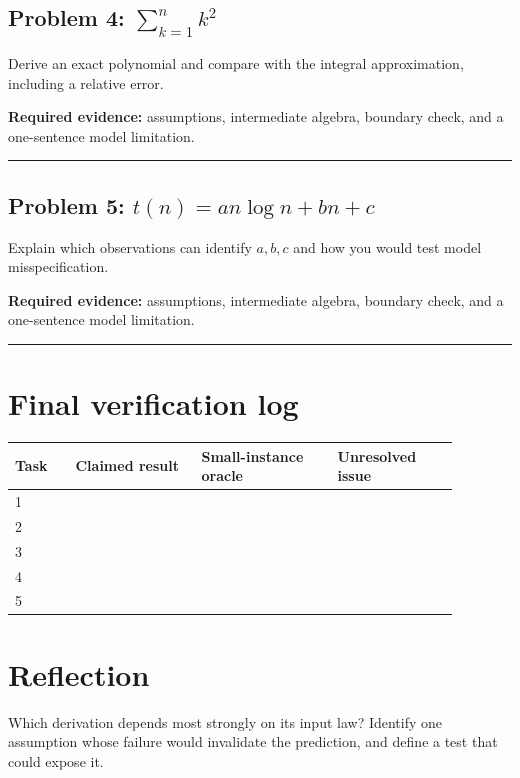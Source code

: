 \documentclass[11pt]{article}
\begin{document}
\subsection{\texorpdfstring{Problem 4: $\sum_{k=1}^{n}k^2$}{Problem 4: Sum of squares from 1 to n}}
Derive an exact polynomial and compare with the integral approximation, including a relative error.\par
\textbf{Required evidence:} assumptions, intermediate algebra, boundary check, and a one-sentence model limitation.\par
\vspace{1.2cm}\hrule\vspace{0.4cm}
\subsection{\texorpdfstring{Problem 5: $t(n)=an\log n+bn+c$}{Problem 5: Leading terms of an n-log-n function}}
Explain which observations can identify $a,b,c$ and how you would test model misspecification.\par
\textbf{Required evidence:} assumptions, intermediate algebra, boundary check, and a one-sentence model limitation.\par
\vspace{1.2cm}\hrule\vspace{0.4cm}
\section{Final verification log}
\begin{longtable}{p{0.12\linewidth}p{0.25\linewidth}p{0.27\linewidth}p{0.24\linewidth}}\toprule Task & Claimed result & Small-instance oracle & Unresolved issue \\ \midrule
1 & & & \\ 2 & & & \\ 3 & & & \\ 4 & & & \\ 5 & & & \\ \bottomrule\end{longtable}
\section{Reflection}
Which derivation depends most strongly on its input law? Identify one assumption whose failure would invalidate the prediction, and define a test that could expose it.
\end{document}
